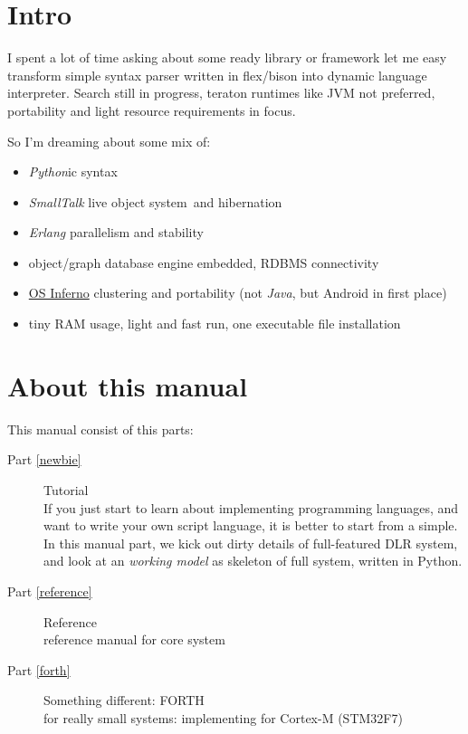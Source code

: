 \clearpage
\section{Intro}%

I spent a lot of time asking about some ready library or framework let me easy
transform simple syntax parser written in flex/bison into dynamic language
interpreter. Search still in progress, teraton runtimes like JVM not preferred,
portability and light resource requirements in focus.

\bigskip
So I'm dreaming about some mix of:
\begin{itemize}[nosep]
  \item \emph{Python}ic syntax 
  \item \emph{SmallTalk} live object system\ and
  hibernation
  \item \emph{Erlang} parallelism and stability
  \item object/graph database engine embedded, RDBMS connectivity
  \item \href{http://www.vitanuova.com/inferno/}{OS Inferno} clustering and
  portability (not \emph{Java}, but Android in first place)
  \item tiny RAM usage, light and fast run, one executable file installation
\end{itemize} 

\section{About this manual}%

This manual consist of this parts:
\begin{description}
\item[Part \ref{newbie}] Tutorial\\
If you just start to learn about implementing programming languages, and want to
write your own script language, it is better to start from a simple. In this
manual part, we kick out dirty details of full-featured DLR system, and look at
an \emph{working model} as skeleton of full system, written in Python.
\item[Part \ref{reference}] Reference\\reference manual for core system
\item[Part \ref{forth}] Something different: FORTH\\
for really small systems: implementing for Cortex-M (STM32F7) 
\end{description}
